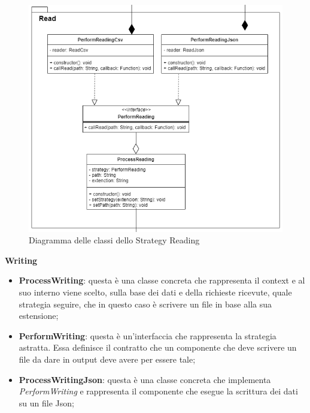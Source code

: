 			\begin{figure} [H]
				\includegraphics[width=\linewidth]{./img/Diagrammi/dAppR.png}
				\caption{Diagramma delle classi dello Strategy Reading}
			\end{figure}
			\textbf{Writing} \mbox{} \\ 
			\begin{itemize}
				\item \textbf{ProcessWriting}: questa è una classe concreta che rappresenta il context e al suo interno viene scelto, sulla base dei dati e della richieste ricevute, quale strategia seguire, che in questo caso è scrivere un file in base alla sua estensione;
				\item \textbf{PerformWriting}: questa è un'interfaccia che rappresenta la strategia astratta. Essa definisce il contratto che un componente che deve scrivere un file da dare in output deve avere per essere tale;
				\item \textbf{ProcessWritingJson}: questa è una classe concreta che implementa \textit{PerformWriting} e rappresenta il componente che esegue la scrittura dei dati su un file Json;
			\end{itemize}
			\mbox{}
			

